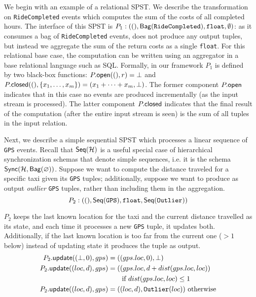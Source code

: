 We begin with an example of a relational SPST.
We describe the transformation on \texttt{RideCompleted}
events which computes the sum of the costs of all completed hours.
The interface of this SPST is $
P_1: ((), \mathsf{Bag}({ \texttt{RideCompleted} }), \texttt{float}, \emptyset)$:
as it consumes a bag of \texttt{RideCompleted} events,
does not produce any output tuples, but instead we aggregate the sum of the return
costs as a single \texttt{float}.
For this relational base case,
the computation can be written using an aggregator in a base relational language
such as SQL.
Formally, in our framework $P_1$ is defined by two black-box functions:
${P}.{\mathsf{open}}((), r) = \bot$
and ${P}.{\mathsf{closed}}((), \{x_1, \ldots, x_m\}) = (x_1 + \cdots + x_m, \bot)$.
The former component ${P}.{\mathsf{open}}$
indicates that in this case no events are produced incrementally
(as the input stream is processed).
The latter component ${P}.{\mathsf{closed}}$
indicates that the final result of the computation (after the entire input stream is seen)
is the sum of all tuples in the input relation.

Next, we describe a simple sequential SPST
which processes a linear sequence of \texttt{GPS}
events.
Recall that $\mathsf{Seq}({\mathcal{H}})$ is a useful special case of hierarchical synchronization schemas
that denote simple sequences, i.e. it is the schema $\mathsf{Sync}({\mathcal{H}}, \mathsf{Bag}({\varnothing}))$.
Suppose we want to compute the distance traveled for a specific taxi given its \texttt{GPS} tuples;
additionally,
suppose we want to produce as output \emph{outlier} \texttt{GPS}
tuples, rather than including them in the aggregation.
\[
P_2: ((),
    \mathsf{Seq}({ \texttt{GPS} }),
    \texttt{float},
    \mathsf{Seq}({ \texttt{Outlier} }))
\]


$P_2$ keeps the last known location for the taxi and the current distance travelled as its state, and each time it processes a new \texttt{GPS} tuple, it updates both.
Additionally, if the last known location is too far from the current one
($> 1$ below)
instead of updating state it produces the tuple as output.
\begin{align*}
{P_2}.{\mathsf{update}}((\bot, 0), gps)
    &= (( gps.loc, 0), \bot) \\
{P_2}.{\mathsf{update}}((loc, d), gps)
    &= (( gps.loc, d + dist(gps.loc, loc)) \\
    &\quad\quad\text{if } dist(gps.loc, loc) \le 1 \\
{P_2}.{\mathsf{update}}((loc, d), gps)
    &= (( loc, d), \texttt{Outlier}(loc)) \text{ otherwise}
\end{align*}

